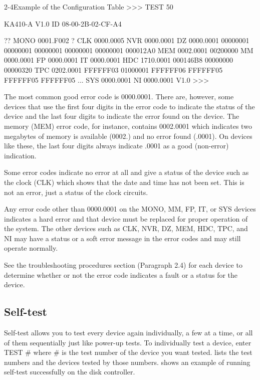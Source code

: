 \begin{ttfig}{2-4}{Example of the Configuration Table}
>>> TEST 50

KA410-A V1.0
ID 08-00-2B-02-CF-A4

?? MONO       0001.F002
 ? CLK        0000.0005
   NVR        0000.0001
   DZ         0000.0001
       00000001 00000001 00000001 00000001 00000001 000012A0
   MEM        0002.0001
       00200000
   MM         0000.0001
   FP         0000.0001
   IT         0000.0001
   HDC        1710.0001
       000146B8 00000000 00000320
   TPC        0202.0001
       FFFFFF03 01000001 FFFFFF06 FFFFFF05 FFFFFF05 FFFFFF05 ...
   SYS        0000.0001
   NI         0000.0001 V1.0
>>>
\end{ttfig}
\newpage
The most common good error code is 0000.0001. There are, however, some
devices that use the first four digits in the error code to indicate the status
of the device and the last four digits to indicate the error found on the
device. The memory (MEM) error code, for instance, contains 0002.0001
which indicates two megabytes of memory is available (0002.) and no error
found (.0001). On devices like these, the last four digits always indicate
.0001 as a good (non-error) indication.

Some error codes indicate no error at all and give a status of the device
such as the clock (CLK) which shows that the date and time has not been
set. This is not an error, just a status of the clock circuits.

Any error code other than 0000.0001 on the MONO, MM, FP, IT, or SYS
devices indicates a hard error and that device must be replaced for proper
operation of the system. The other devices such as CLK, NVR, DZ, MEM,
HDC, TPC, and NI may have a status or a soft error message in the error
codes and may still operate normally.

See the troubleshooting procedures section (Paragraph 2.4) for each device
to determine whether or not the error code indicates a fault or a status for
the device.

\subsection{Self-test}

Self-test allows you to test every device again individually, a few at a time,
or all of them sequentially just like power-up tests. To individually test a
device, enter TEST \# where \# is the test number of the device you want
tested.  lists the test numbers and the devices tested by those
numbers.  shows an example of running self-test successfully on
the disk controller.

